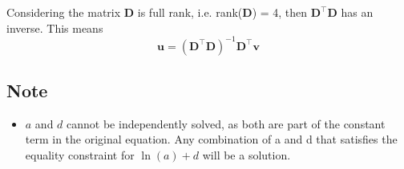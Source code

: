 \documentclass[12pt,a4paper]{article}
\begin{document}
\begin{center}

\end{center}
\noindent Considering the matrix $\textbf{D}$ is full rank, i.e. rank($\textbf{D}$) = 4, then $\textbf{D}^\top\textbf{D}$ has an inverse. This means
\begin{equation}\label{solutionrep}
\textbf{u}=(\textbf{D}^\top\textbf{D})^{-1} \textbf{D}^\top\textbf{v}
\end{equation}

\subsection*{Note}

\begin{itemize}
    \item $a$ and $d$ cannot be independently solved, as both are part of the constant term in the original equation. Any combination of a and d that satisfies the equality constraint for $\ln (a) + d$ will be a solution.
\end{itemize}
\end{document}
